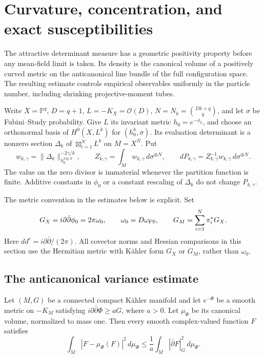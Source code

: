 \section{Curvature, concentration, and exact susceptibilities}
\label{ac:section}

The attractive determinant measure has a geometric positivity property
before any mean-field limit is taken.  Its density is the canonical
volume of a positively curved metric on the anticanonical line bundle
of the full configuration space.  The resulting estimate controls
empirical observables uniformly in the particle number, including
shrinking projective-moment tubes.

Write $X=\mathbb P^q$, $D=q+1$, $L=-K_X=\mathcal O(D)$,
$N=N_k=\binom{Dk+q}{q}$, and let $\sigma$ be Fubini--Study
probability.  Give $L$ its invariant metric $h_0=e^{-\phi_0}$, and
choose an orthonormal basis of $H^0(X,L^k)$ for $(h_0^k,\sigma)$.
Its evaluation determinant is a nonzero section $\Delta_k$ of
$\boxtimes_{i=1}^N L^k$ on $M=X^N$.  Put
\[
 w_{k,\gamma}=\|\Delta_k\|_{h_0^{k\boxtimes N}}^{-2\gamma/k},
 \qquad
 Z_{k,\gamma}=\int_M w_{k,\gamma}\,d\sigma^{\otimes N},
 \qquad
 dP_{k,\gamma}=Z_{k,\gamma}^{-1}w_{k,\gamma}
                                      \,d\sigma^{\otimes N}.
\]
The value on the zero divisor is immaterial whenever the partition
function is finite.  Additive constants in $\phi_0$ or a constant
rescaling of $\Delta_k$ do not change $P_{k,\gamma}$.

The metric convention in the estimates below is explicit.  Set
\[
 G_X=i\partial\bar\partial\phi_0=2\pi\omega_0,
 \qquad \omega_0=D\omega_{\rm FS},
 \qquad G_M=\sum_{i=1}^N\pi_i^*G_X.
\]
Here $dd^c=i\partial\bar\partial/(2\pi)$.  All covector norms
and Hessian comparisons in this section use the Hermitian metric with
K\"ahler form $G_X$ or $G_M$, rather than $\omega_0$.

\subsection{The anticanonical variance estimate}

\begin{lemma}
\label{ac:canonical-poincare}
Let $(M,G)$ be a connected compact K\"ahler manifold and let
$e^{-\Phi}$ be a smooth metric on $-K_M$ satisfying
$i\partial\bar\partial\Phi\ge aG$, where $a>0$.
Let $\mu_\Phi$ be its canonical volume, normalized to mass one.
Then every smooth complex-valued function $F$ satisfies
\begin{equation}
 \int_M|F-\mu_\Phi(F)|^2\,d\mu_\Phi
 \le \frac1a\int_M|\bar\partial F|_G^2\,d\mu_\Phi.
 \label{ac:canonical-poincare-eq}
\end{equation}
\end{lemma}

